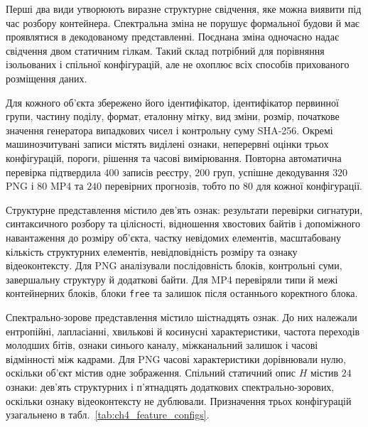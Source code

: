 Перші два види утворюють виразне структурне свідчення, яке можна виявити під час розбору контейнера. Спектральна зміна не порушує формальної будови й має проявлятися в декодованому представленні. Поєднана зміна одночасно надає свідчення двом статичним гілкам. Такий склад потрібний для порівняння ізольованих і спільної конфігурацій, але не охоплює всіх способів прихованого розміщення даних.

Для кожного об’єкта збережено його ідентифікатор, ідентифікатор первинної групи, частину поділу, формат, еталонну мітку, вид зміни, розмір, початкове значення генератора випадкових чисел і контрольну суму SHA-256. Окремі машинозчитувані записи містять виділені ознаки, неперервні оцінки трьох конфігурацій, пороги, рішення та часові вимірювання. Повторна автоматична перевірка підтвердила $400$ записів реєстру, $200$ груп, успішне декодування $320$ PNG і $80$ MP4 та $240$ перевірних прогнозів, тобто по $80$ для кожної конфігурації.

Структурне представлення містило дев’ять ознак: результати перевірки сигнатури, синтаксичного розбору та цілісності, відношення хвостових байтів і допоміжного навантаження до розміру об’єкта, частку невідомих елементів, масштабовану кількість структурних елементів, невідповідність розміру та ознаку відеоконтексту. Для PNG аналізували послідовність блоків, контрольні суми, завершальну структуру й додаткові байти. Для MP4 перевіряли типи й межі контейнерних блоків, блоки \texttt{free} та залишок після останнього коректного блока.

Спектрально-зорове представлення містило шістнадцять ознак. До них належали ентропійні, лапласіанні, хвилькові й косинусні характеристики, частота переходів молодших бітів, ознаки синього каналу, міжканальний залишок і часові відмінності між кадрами. Для PNG часові характеристики дорівнювали нулю, оскільки об’єкт містив одне зображення. Спільний статичний опис $H$ містив $24$ ознаки: дев’ять структурних і п’ятнадцять додаткових спектрально-зорових, оскільки ознаку відеоконтексту не дублювали. Призначення трьох конфігурацій узагальнено в табл.~\ref{tab:ch4_feature_configs}.

